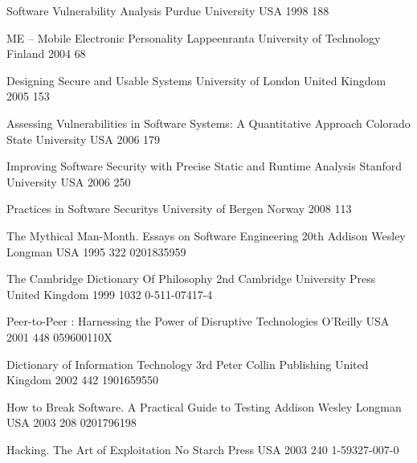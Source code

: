 \begin{thebibliography}{9}

		{}
		{Software Vulnerability Analysis}
		{Purdue University}
		{USA}
		{1998}
		{188}

		{}
		{ME -- Mobile Electronic Personality}
		{Lappeenranta University of Technology}
		{Finland}
		{2004}
		{68}
		
		{}
		{Designing Secure and Usable Systems}
		{University of London}
		{United Kingdom}
		{2005}
		{153}
	
		{}
		{Assessing Vulnerabilities in Software Systems: A Quantitative Approach}
		{Colorado State University}
		{USA}
		{2006}
		{179}
		
		{}
		{Improving Software Security with Precise Static and Runtime Analysis}
		{Stanford University}
		{USA}
		{2006}
		{250}
	
		{}
		{Practices in Software Securitys}
		{University of Bergen}
		{Norway}
		{2008}
		{113}


		{}
		{The Mythical Man-Month. Essays on Software Engineering}
		{20th}
		{Addison Wesley Longman}
		{USA}
		{1995}
		{322}
		{0201835959}
	
		{}
		{The {C}ambridge {D}ictionary Of {P}hilosophy}
		{2nd}
		{Cambridge University Press}
		{United Kingdom}
		{1999}
		{1032}
		{0-511-07417-4}
	
		{}
		{Peer-to-Peer : Harnessing the Power of Disruptive Technologies}
		{}
		{O'Reilly}
		{USA}
		{2001}
		{448}
		{059600110X}
		
		{} %
		{Dictionary of {I}nformation {T}echnology}
		{3rd}
		{Peter Collin Publishing}
		{United Kingdom}
		{2002}
		{442}
		{1901659550}
		
		{}
		{How to Break Software. A Practical Guide to Testing}
		{}
		{Addison Wesley Longman}
		{USA}
		{2003}
		{208}
		{0201796198}
	
		{}
		{Hacking. The Art of Exploitation}
		{}
		{No Starch Press}
		{USA}
		{2003}
		{240}
		{1-59327-007-0}
	

\end{thebibliography}
